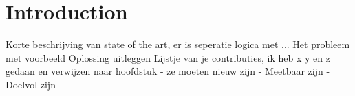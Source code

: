 \documentclass[11pt,a4paper]{report}
\begin{document}


\tableofcontents

\chapter{Introduction}
Korte beschrijving van state of the art, er is seperatie logica met ...
Het probleem met voorbeeld
Oplossing uitleggen
Lijstje van je contributies, ik heb x y en z gedaan en verwijzen naar hoofdstuk
- ze moeten nieuw zijn
- Meetbaar zijn
- Doelvol zijn





% 


\printbibliography

\newpage
\mbox{}
\thispagestyle{empty}
\newpage
\mbox{}
\thispagestyle{empty}
\end{document}
